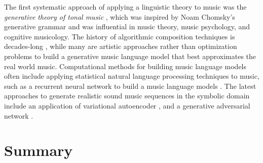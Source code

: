 The first systematic approach of applying a linguistic theory to music was the \emph{generative theory of tonal music} \cite{lerdahl1983gttm}, which was inspired by Noam Chomsky's generative grammar \cite{chomsky1966generative} and was influential in music theory, music psychology, and cognitive musicology.
The history of algorithmic composition techniques is decades-long \cite{fernandez2013ai}, while many are artistic approaches rather than optimization problems to build a generative music language model that best approximates the real world music.
Computational methods for building music language models often include applying statistical natural language processing techniques to music, such as a recurrent neural network to build a music language models \cite{sigtia2014lm}.
The latest approaches to generate realistic sound music sequences in the symbolic domain include an application of variational autoencoder \cite{teng2017generating,tikhonov2017generation}, and a generative adversarial network \cite{yang2017midinet}.

\section{Summary}